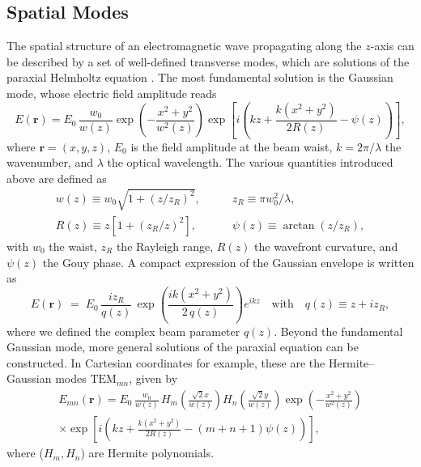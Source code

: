 \subsection{Spatial Modes}
The spatial structure of an electromagnetic wave propagating along the $z$-axis can be described by a set of well-defined transverse modes, which are solutions of the paraxial Helmholtz equation \cite{siegman1986lasers}. The most fundamental solution is the Gaussian mode, whose electric field amplitude reads
\begin{equation}
E(\mathbf r) = E_0 \, \frac{w_0}{w(z)} 
\exp\!\left(-\frac{x^2+y^2}{w^2(z)}\right) 
\exp\!\left[i\!\left(kz + \frac{k(x^2+y^2)}{2R(z)} - \psi(z)\right)\right],
\end{equation}
where $\mathbf r = (x, y, z)$, $E_0$ is the field amplitude at the beam waist, $k = 2\pi/\lambda$ the wavenumber, and $\lambda$ the optical wavelength. The various quantities introduced above are defined as
\begin{equation*}
  \begin{split}
w(z) \equiv w_0 \sqrt{1+(z/z_R)^2}, \quad & \quad
z_R \equiv \pi w_0^2/\lambda, \\
R(z) \equiv z\left[1+(z_R/z)^2\right], \quad &\quad
\psi(z) \equiv \arctan(z/z_R),
  \end{split}
\end{equation*}
with $w_0$ the waist, $z_R$ the Rayleigh range, $R(z)$ the wavefront curvature, and $\psi(z)$ the Gouy phase. 
A compact expression of the Gaussian envelope is written as
\begin{equation}
E(\mathbf r) \;=\; E_0 \,\frac{i z_R}{q(z)} \,
\exp\!\left(\frac{i k (x^2+y^2)}{2\,q(z)}\right) e^{i k z}  \quad  \text{with} \quad q(z) \equiv z + i z_R,
\label{II.1}
\end{equation}
where we defined the complex beam parameter $q(z)$. 
Beyond the fundamental Gaussian mode, more general solutions of the paraxial equation can be constructed. In Cartesian coordinates for example, these are the Hermite--Gaussian modes $\mathrm{TEM}_{mn}$, given by
\begin{multline}
E_{mn}(\mathbf{r}) = E_0 \, \frac{w_0}{w(z)} \,
H_m\!\left(\frac{\sqrt{2}x}{w(z)}\right) 
H_n\!\left(\frac{\sqrt{2}y}{w(z)}\right) 
\exp\!\left(-\frac{x^2+y^2}{w^2(z)}\right) \\
\times \exp\!\left[i\!\left(kz + \frac{k(x^2+y^2)}{2R(z)} - (m+n+1)\psi(z)\right)\right],
\end{multline}
where ($H_m, H_n$) are Hermite polynomials. 

